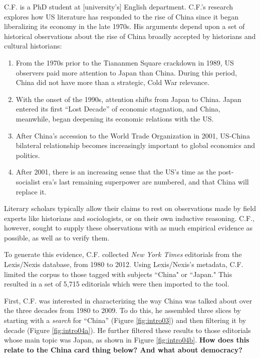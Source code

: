 \documentclass{sig-alternate}
\newcommand{\strong}[1] {\textbf{#1}}
\begin{document}
C.F. is a PhD student at [university's] English department. C.F.'s research explores how US literature has responded to the rise of China since it began liberalizing its economy in the late 1970s.  His arguments depend upon a set of historical observations about the rise of China  broadly accepted by historians and cultural historians: 
\begin{enumerate}
\item From the 1970s prior to the Tiananmen Square crackdown in 1989, US observers paid more attention to Japan than China. During this period, China did not have  more than a strategic, Cold War relevance. 
\item With the onset of the 1990s, attention shifts from Japan to China. Japan entered its first ``Lost Decade'' of economic stagnation, and China, meanwhile, began deepening its economic relations with the US.
\item After China's accession to the World Trade Organization in 2001, US-China bilateral relationship becomes increasingly important to global economics and politics.
\item After 2001, there is an increasing sense that the US's time as the post-socialist era's last remaining superpower are numbered, and that China will replace it.
\end{enumerate}
Literary scholars typically allow their claims to rest on observations made by field experts like historians and sociologists, or on their own inductive reasoning. C.F., however, sought to supply these observations with as much empirical evidence as possible, as well as to verify them.

To generate this evidence, C.F. collected \emph{New York Times} editorials from  the Lexis/Nexis database, from 1980 to 2012. Using Lexis/Nexis's metadata, C.F. limited the corpus to those tagged with subjects ``China" or ``Japan." This resulted in a set of 5,715 editorials which were then imported to the tool.

First, C.F. was interested in characterizing the way China was talked about over the three decades from 1980 to 2009. To do this, he assembled three slices by starting with a \emph{search} for ``China'' (Figure \ref{fig:intro03})  and then filtering it by decade (Figure \ref{fig:intro04a}).  He further filtered these results to those editorials whose main topic was Japan, as shown in Figure \ref{fig:intro04b}. \strong{How does this relate to the China card thing below?  And what about democracy?}
\end{document}

